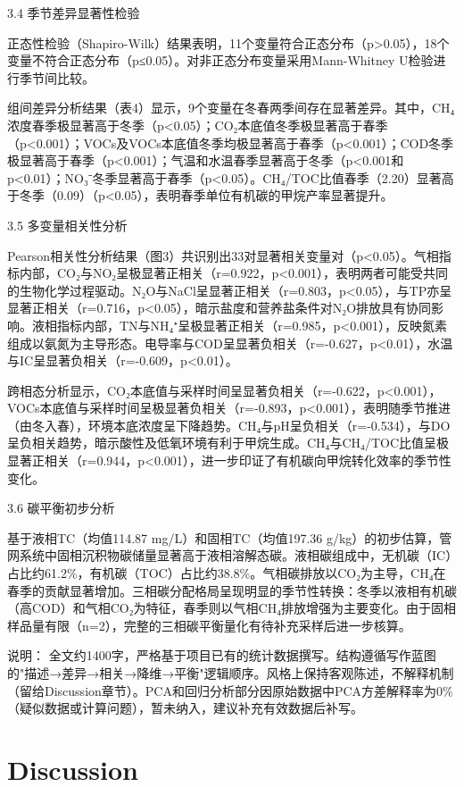 \documentclass[12pt]{article}
\begin{document}
3.4 季节差异显著性检验

正态性检验（Shapiro-Wilk）结果表明，11个变量符合正态分布（p>0.05），18个变量不符合正态分布（p≤0.05）。对非正态分布变量采用Mann-Whitney U检验进行季节间比较。

组间差异分析结果（表4）显示，9个变量在冬春两季间存在显著差异。其中，CH₄浓度春季极显著高于冬季（p<0.05）；CO₂本底值冬季极显著高于春季（p<0.001）；VOCs及VOCs本底值冬季均极显著高于春季（p<0.001）；COD冬季极显著高于春季（p<0.001）；气温和水温春季显著高于冬季（p<0.001和p<0.01）；NO₃⁻冬季显著高于春季（p<0.05）。CH₄/TOC比值春季（2.20）显著高于冬季（0.09）（p<0.05），表明春季单位有机碳的甲烷产率显著提升。

3.5 多变量相关性分析

Pearson相关性分析结果（图3）共识别出33对显著相关变量对（p<0.05）。气相指标内部，CO₂与NO₂呈极显著正相关（r=0.922，p<0.001），表明两者可能受共同的生物化学过程驱动。N₂O与NaCl呈显著正相关（r=0.803，p<0.05），与TP亦呈显著正相关（r=0.716，p<0.05），暗示盐度和营养盐条件对N₂O排放具有协同影响。液相指标内部，TN与NH₄⁺呈极显著正相关（r=0.985，p<0.001），反映氮素组成以氨氮为主导形态。电导率与COD呈显著负相关（r=-0.627，p<0.01），水温与IC呈显著负相关（r=-0.609，p<0.01）。

跨相态分析显示，CO₂本底值与采样时间呈显著负相关（r=-0.622，p<0.001），VOCs本底值与采样时间呈极显著负相关（r=-0.893，p<0.001），表明随季节推进（由冬入春），环境本底浓度呈下降趋势。CH₄与pH呈负相关（r=-0.534），与DO呈负相关趋势，暗示酸性及低氧环境有利于甲烷生成。CH₄与CH₄/TOC比值呈极显著正相关（r=0.944，p<0.001），进一步印证了有机碳向甲烷转化效率的季节性变化。

3.6 碳平衡初步分析

基于液相TC（均值114.87 mg/L）和固相TC（均值197.36 g/kg）的初步估算，管网系统中固相沉积物碳储量显著高于液相溶解态碳。液相碳组成中，无机碳（IC）占比约61.2\%，有机碳（TOC）占比约38.8\%。气相碳排放以CO₂为主导，CH₄在春季的贡献显著增加。三相碳分配格局呈现明显的季节性转换：冬季以液相有机碳（高COD）和气相CO₂为特征，春季则以气相CH₄排放增强为主要变化。由于固相样品量有限（n=2），完整的三相碳平衡量化有待补充采样后进一步核算。

说明： 全文约1400字，严格基于项目已有的统计数据撰写。结构遵循写作蓝图的"描述→差异→相关→降维→平衡"逻辑顺序。风格上保持客观陈述，不解释机制（留给Discussion章节）。PCA和回归分析部分因原始数据中PCA方差解释率为0\%（疑似数据或计算问题），暂未纳入，建议补充有效数据后补写。

\section{Discussion}
\label{sec:discussion}
\end{document}
